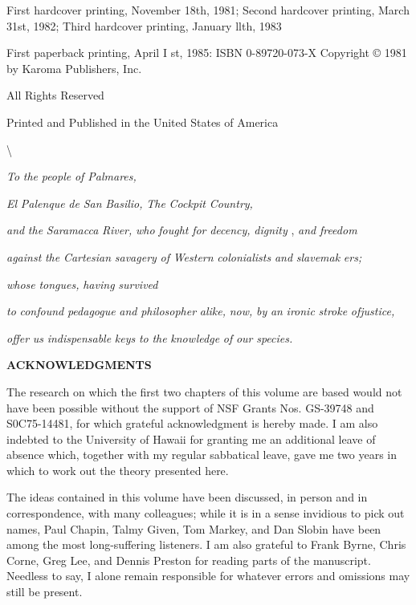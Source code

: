 
First hardcover printing, November 18th, 1981; Second hardcover printing, March 31st, 1982; Third hardcover printing, January llth, 1983

First paperback printing, April I st, 1985: ISBN 0-89720-073-X Copyright © 1981 by Karoma Publishers, Inc.

All Rights Reserved

Printed and Published in the United States of America

{\textbackslash}

\textit{To} \textit{the} \textit{people} \textit{of Palmares,}

\textit{El} \textit{Palenque} \textit{d}\textit{e} \textit{San} \textit{Basilio,} \textit{The} \textit{Cockpit} \textit{Country,}

\textit{and} \textit{the} \textit{Saramacca} \textit{River,} \textit{who} \textit{fought} \textit{for} \textit{decency,} \textit{dignity} , \textit{and} \textit{freedom}

\textit{against} \textit{the} \textit{Cartesian} \textit{savagery} \textit{of} \textit{Western} \textit{colonialists} \textit{and} \textit{slavemak} \textit{ers;}

\textit{whose} \textit{tongues,} \textit{having} \textit{survived}

\textit{to} \textit{confound} \textit{pedagogue} \textit{and} \textit{philosopher} \textit{alike,} \textit{now,} \textit{by} \textit{an} \textit{ironic} \textit{stroke} \textit{ofjustice,}

\textit{offer} \textit{us} \textit{indispensable} \textit{keys} \textit{to} \textit{the} \textit{knowledge} \textit{of} \textit{our} \textit{species.}

\bfseries
\hypertarget{TOC250001}{}ACKNOWLEDGMENTS

The research on which the first two chapters of this volume are based would not have been possible without the support of NSF Grants Nos. GS-39748 and S0C75-14481, for which grateful acknowledgment is hereby made. I am also indebted to the University of Hawaii for granting me an additional leave of absence which, together with my regular sabbatical leave, gave me two years in which to work out the theory presented here.

The ideas contained in this volume have been discussed, in person and in correspondence, with many colleagues; while it is in a sense in\-vidious to pick out names, Paul Chapin, Talmy Given, Tom Markey, and Dan Slobin have been among the most long-suffering listeners. I am also grateful to Frank Byrne, Chris Corne, Greg Lee, and Dennis Pres\-ton for reading parts of the manuscript. Needless to say, I alone remain responsible for whatever errors and omissions may still be present.

